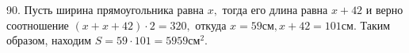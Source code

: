 90. Пусть ширина прямоугольника равна $x,$ тогда его длина равна $x+42$ и верно соотношение $(x+x+42)\cdot2=320,$ откуда $x=59\text{см}, x+42=101\text{см}.$ Таким образом, находим
$S=59\cdot101=5959\text{см}^2.$\\
